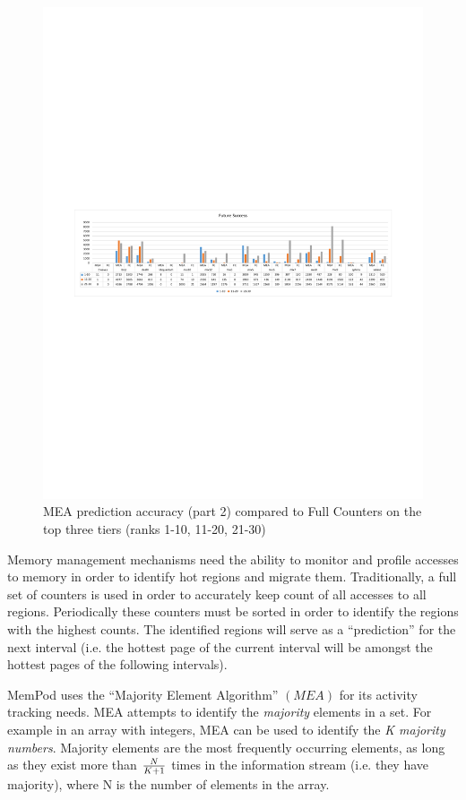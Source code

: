\begin{figure}[t]
  \includegraphics[width=\textwidth]{figures/mea_3.pdf}
  \caption{MEA prediction accuracy (part 2) compared to Full Counters on the top three tiers (ranks 1-10, 11-20, 21-30)}
  \label{fig:mea_3}
\end{figure}

Memory management mechanisms need the ability to monitor and profile accesses to memory in order to identify hot regions and migrate them. Traditionally, a full set of counters is used in order to accurately keep count of all accesses to all regions. Periodically these counters must be sorted in order to identify the regions with the highest counts. The identified regions will serve as a ``prediction'' for the next interval (i.e. the hottest page of the current interval will be amongst the hottest pages of the following intervals).

MemPod uses the ``Majority Element Algorithm'' $(MEA)$ for its activity tracking needs. MEA attempts to identify the \textit{majority} elements in a set. For example in an array with integers, MEA can be used to identify the \textit{K majority numbers}. Majority elements are the most frequently occurring elements, as long as they exist more than $N \over K+1$ times in the information stream (i.e. they have majority), where N is the number of elements in the array.


